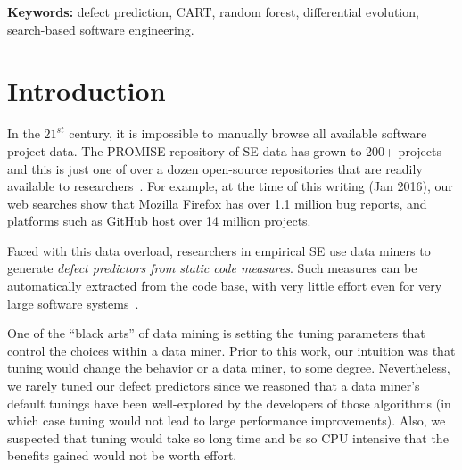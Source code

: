 \documentclass[final,twocolumn,5p]{elsarticle}
\begin{document}

 
\vspace{1mm}
\noindent
{\bf Keywords:} defect prediction, CART, random forest,
differential evolution,
search-based software engineering.
{} %

\section{Introduction}
 
In the $21^{st}$ century, it is  impossible
to manually browse all  available software project
data. The PROMISE repository of SE data has grown to 200+ projects~\cite{promise15}
and this is just one of over a dozen open-source repositories
that are readily available to researchers~\cite{rod12}.
For example, at the time of this writing (Jan 2016), our web searches show that Mozilla Firefox has over 1.1 million bug reports, and platforms such as GitHub host over 14 million projects. 


Faced with this data overload,
researchers in empirical SE
use  data miners  to generate 
{\em defect predictors from static code measures}.
Such   measures can be
automatically extracted from the code base, with very little effort
even for very large software systems~\cite{nagappan05}. 

One of the ``black arts'' of data mining is setting the tuning
parameters that control  the choices within a data miner.
Prior to this work, our intuition was that tuning would change the behavior or a data miner, to some degree. Nevertheless, we rarely tuned our  defect predictors 
since we reasoned
that a data miner's default tunings have been well-explored by the developers of those algorithms (in which case
tuning would not lead to large performance improvements).
Also, we suspected that
tuning would take so long time and be so CPU intensive that the benefits gained   would not be worth effort.
\end{document}
